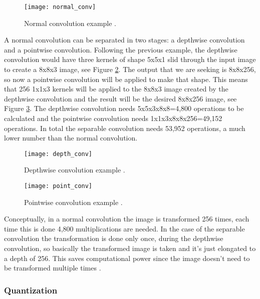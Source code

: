 \begin{figure}[thbp]
	\centering
	\texttt{[image: normal\_conv]}
	\caption{Normal convolution example \cite{sep_conv}.}
	\label{fig:normal_conv}
\end{figure}

A normal convolution can be separated in two stages: a depthwise convolution and a pointwise convolution. Following the previous example, the depthwise convolution would have three kernels of shape 5x5x1 slid through the input image to create a 8x8x3 image, see Figure \ref{fig:depth_conv}. The output that we are seeking is 8x8x256, so now a pointwise convolution will be applied to make that shape. This means that 256 1x1x3 kernels will be applied to the 8x8x3 image created by the depthwise convolution and the result will be the desired 8x8x256 image, see Figure \ref{fig:point_conv}. The depthwise convolution needs 5x5x3x8x8=4,800 operations to be calculated and the pointwise convolution needs 1x1x3x8x8x256=49,152 operations. In total the separable convolution needs 53,952 operations, a much lower number than the normal convolution.

\begin{figure}[thbp]
	\centering
	\texttt{[image: depth\_conv]}
	\caption{Depthwise convolution example \cite{sep_conv}.}
	\label{fig:depth_conv}
\end{figure}

\begin{figure}[thbp]
	\centering
	\texttt{[image: point\_conv]}
	\caption{Pointwise convolution example \cite{sep_conv}.}
	\label{fig:point_conv}
\end{figure}

Conceptually, in a normal convolution the image is transformed 256 times, each time this is done 4,800 multiplications are needed. In the case of the separable convolution the transformation is done only once, during the depthwise convolution, so basically the transformed image is taken and it's just elongated to a depth of 256. This saves computational power since the image doesn't need to be transformed multiple times \cite{sep_conv}.

\subsubsection{Quantization}

